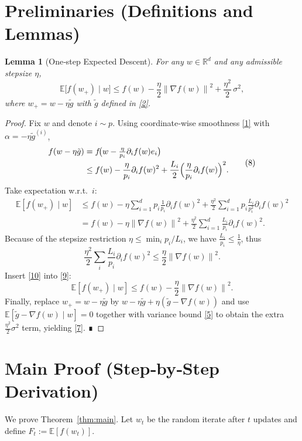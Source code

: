 \documentclass{article}
\newtheorem{lemma}{Lemma}
\newcommand{\E}{\mathbb{E}}
\newcommand{\R}{\mathbb{R}}
\newcommand{\norm}[1]{\left\lVert#1\right\rVert}
\begin{document}
\section*{Preliminaries (Definitions and Lemmas)}
\begin{lemma}[One‑step Expected Descent]\label{lem:descent}
For any $w\in\R^{d}$ and any admissible stepsize $\eta$,
\[
\E\!\bigl[f(w_{+})\mid w\bigr]
\le f(w)-\frac{\eta}{2}\norm{\nabla f(w)}^{2}
+\frac{\eta^{2}}{2}\,\sigma^{2},
\tag{7}
\]
where $w_{+}=w-\eta\tilde g$ with $\tilde g$ defined in \eqref{2}.
\end{lemma}
\begin{proof}
Fix $w$ and denote $i\sim p$. Using coordinate‑wise smoothness \eqref{1} with $\alpha=-\eta\tilde g^{(i)}$,
\[
\begin{aligned}
f(w-\eta\tilde g)
&= f\!\bigl(w-\tfrac{\eta}{p_i}\partial_i f(w)e_i\bigr)\\
&\le f(w)-\frac{\eta}{p_i}\partial_i f(w)^{2}
+\frac{L_i}{2}\Bigl(\frac{\eta}{p_i}\partial_i f(w)\Bigr)^{2}.
\end{aligned}
\tag{8}
\]
Take expectation w.r.t.\ $i$:
\[
\begin{aligned}
\E[f(w_{+})\mid w]
&\le f(w)-\eta\sum_{i=1}^{d}p_i\frac{1}{p_i}\partial_i f(w)^{2}
+\frac{\eta^{2}}{2}\sum_{i=1}^{d}p_i\frac{L_i}{p_i^{2}}\partial_i f(w)^{2}\\
&= f(w)-\eta\norm{\nabla f(w)}^{2}
+\frac{\eta^{2}}{2}\sum_{i=1}^{d}\frac{L_i}{p_i}\partial_i f(w)^{2}.
\end{aligned}
\tag{9}
\]
Because of the stepsize restriction $\eta\le \min_i p_i/L_i$, we have $\frac{L_i}{p_i}\le\frac{1}{\eta}$, thus
\[
\frac{\eta^{2}}{2}\sum_{i}\frac{L_i}{p_i}\partial_i f(w)^{2}
\le\frac{\eta}{2}\norm{\nabla f(w)}^{2}.
\tag{10}
\]
Insert \eqref{10} into \eqref{9}:
\[
\E[f(w_{+})\mid w]\le f(w)-\frac{\eta}{2}\norm{\nabla f(w)}^{2}.
\tag{11}
\]
Finally, replace $w_{+}=w-\eta\tilde g$ by $w-\eta\tilde g+\eta(\tilde g-\nabla f(w))$ and use $\E[\tilde g-\nabla f(w)\mid w]=0$ together with variance bound \eqref{5} to obtain the extra $\frac{\eta^{2}}{2}\sigma^{2}$ term, yielding \eqref{7}.  ∎
\end{proof}

\section*{Main Proof (Step‑by‑Step Derivation)}
We prove Theorem~\ref{thm:main}.  
Let $w_t$ be the random iterate after $t$ updates and define $F_t:=\E[f(w_t)]$.
\end{document}
